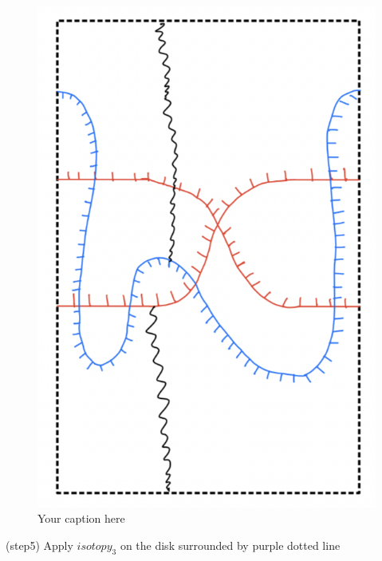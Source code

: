 \begin{figure}[H] %
    \centering
    \includegraphics[scale = 0.95]{diagrams/lemma10/10.png} %
    \caption{Your caption here}
    \label{fig:your-label}
\end{figure}

(step5) Apply $isotopy_3$ on the disk surrounded by purple dotted line 

